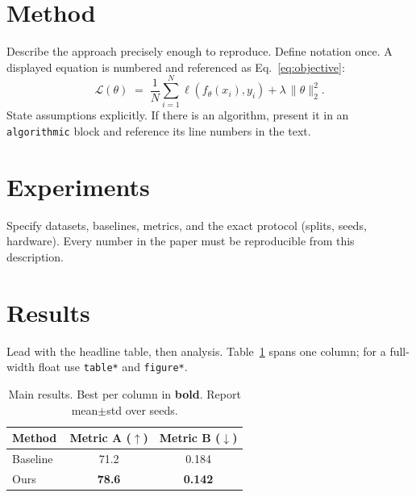 \documentclass[conference]{IEEEtran}
\begin{document}
\section{Method}\label{sec:method}
Describe the approach precisely enough to reproduce. Define notation once. A
displayed equation is numbered and referenced as Eq.~\eqref{eq:objective}:
\begin{equation}\label{eq:objective}
\mathcal{L}(\theta) \;=\; \frac{1}{N}\sum_{i=1}^{N} \ell\!\left(f_\theta(x_i), y_i\right) + \lambda\,\lVert\theta\rVert_2^2 .
\end{equation}
State assumptions explicitly. If there is an algorithm, present it in an
\texttt{algorithmic} block and reference its line numbers in the text.

\section{Experiments}\label{sec:exp}
Specify datasets, baselines, metrics, and the exact protocol (splits, seeds,
hardware). Every number in the paper must be reproducible from this description.

\section{Results}\label{sec:results}
Lead with the headline table, then analysis. Table~\ref{tab:main} spans one column;
for a full-width float use \verb|table*| and \verb|figure*|.
\begin{table}[t]
\caption{Main results. Best per column in \textbf{bold}. Report mean$\pm$std over seeds.}
\label{tab:main}
\centering
\begin{tabular}{lcc}
\toprule
Method & Metric A ($\uparrow$) & Metric B ($\downarrow$) \\
\midrule
Baseline~\cite{ref_baseline} & 71.2 & 0.184 \\
Ours                         & \textbf{78.6} & \textbf{0.142} \\
\bottomrule
\end{tabular}
\end{table}

\end{document}
